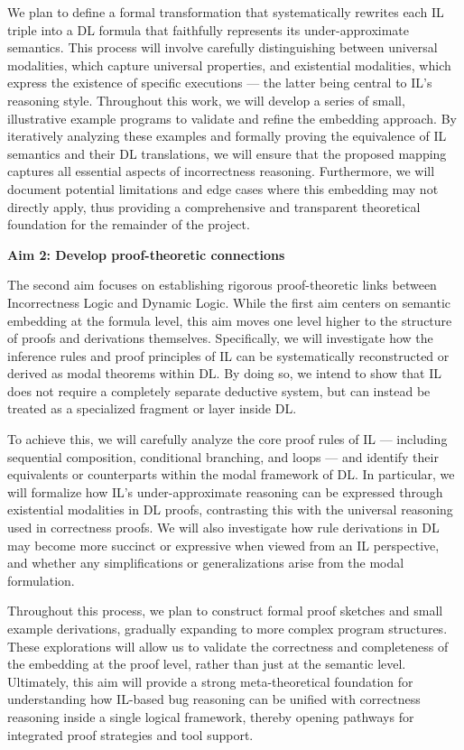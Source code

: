 We plan to define a formal transformation that systematically rewrites each IL triple into a DL formula that faithfully represents its under-approximate semantics. This process will involve carefully distinguishing between universal modalities, which capture universal properties, and existential modalities, which express the existence of specific executions — the latter being central to IL’s reasoning style. Throughout this work, we will develop a series of small, illustrative example programs to validate and refine the embedding approach. By iteratively analyzing these examples and formally proving the equivalence of IL semantics and their DL translations, we will ensure that the proposed mapping captures all essential aspects of incorrectness reasoning. Furthermore, we will document potential limitations and edge cases where this embedding may not directly apply, thus providing a comprehensive and transparent theoretical foundation for the remainder of the project.

\textbf{Aim 2: Develop proof-theoretic connections}

The second aim focuses on establishing rigorous proof-theoretic links between Incorrectness Logic and Dynamic Logic. While the first aim centers on semantic embedding at the formula level, this aim moves one level higher to the structure of proofs and derivations themselves. Specifically, we will investigate how the inference rules and proof principles of IL can be systematically reconstructed or derived as modal theorems within DL. By doing so, we intend to show that IL does not require a completely separate deductive system, but can instead be treated as a specialized fragment or layer inside DL.

To achieve this, we will carefully analyze the core proof rules of IL — including sequential composition, conditional branching, and loops — and identify their equivalents or counterparts within the modal framework of DL. In particular, we will formalize how IL’s under-approximate reasoning can be expressed through existential modalities in DL proofs, contrasting this with the universal reasoning used in correctness proofs. We will also investigate how rule derivations in DL may become more succinct or expressive when viewed from an IL perspective, and whether any simplifications or generalizations arise from the modal formulation.

Throughout this process, we plan to construct formal proof sketches and small example derivations, gradually expanding to more complex program structures. These explorations will allow us to validate the correctness and completeness of the embedding at the proof level, rather than just at the semantic level. Ultimately, this aim will provide a strong meta-theoretical foundation for understanding how IL-based bug reasoning can be unified with correctness reasoning inside a single logical framework, thereby opening pathways for integrated proof strategies and tool support.

